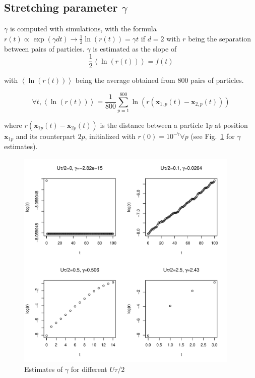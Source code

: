 \subsection*{Stretching parameter $\gamma$}

$\gamma$ is computed with simulations, with the formula $r(t)\propto \exp(\gamma dt)\rightarrow\frac{1}{2}\ln(r(t))=\gamma t$
if $d=2$ with $r$ being the separation between pairs of particles. $\gamma$ is estimated as the slope of $$\frac{1}{2}\left\langle \ln(r(t))\right\rangle =f(t)$$

with $\left\langle \ln(r(t))\right\rangle $ being the average obtained from 800 pairs of particles. 

$$\forall t,\left\langle \ln(r(t))\right\rangle =\frac{1}{800}\sum_{p=1}^{800}\ln(r(\boldsymbol{x}_{1,p}(t)-\boldsymbol{x}_{2,p}(t)))$$ 

where $r(\boldsymbol{x}_{1p}(t)-\boldsymbol{x}_{2p}(t))$ is the distance between a particle $1p$ at position $\boldsymbol{x}_{1p}$ and its counterpart $2p$, initialized with $r(0)=10^{-7}\forall p$ (see Fig.~\ref{fig:gamma_Utot} for $\gamma$ estimates).

\begin{figure}[H]
\begin{centering}
\includegraphics[width=0.95\textwidth]{../code/figure/gamma_for_different_Utot.pdf}
\par\end{centering}
\caption{Estimates of $\gamma$ for different $U\tau/2$\label{fig:gamma_Utot}}
\end{figure}

